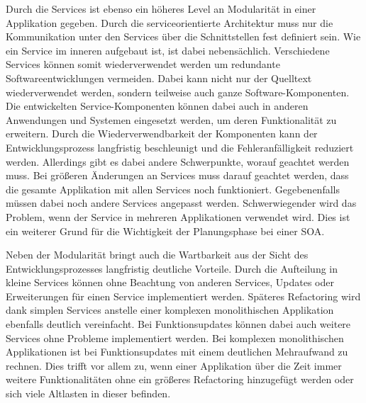 Durch die Services ist ebenso ein höheres Level an Modularität in einer Applikation gegeben. Durch die serviceorientierte Architektur muss nur die Kommunikation unter den Services über die Schnittstellen fest definiert sein. Wie ein Service im inneren aufgebaut ist, ist dabei nebensächlich. Verschiedene Services können somit wiederverwendet werden um redundante Softwareentwicklungen vermeiden. Dabei kann nicht nur der Quelltext wiederverwendet werden, sondern teilweise auch ganze Software-Komponenten. Die entwickelten Service-Komponenten können dabei auch in anderen Anwendungen und Systemen eingesetzt werden, um deren Funktionalität zu erweitern. Durch die Wiederverwendbarkeit der Komponenten kann der Entwicklungsprozess langfristig beschleunigt und die Fehleranfälligkeit reduziert werden. Allerdings gibt es dabei andere Schwerpunkte, worauf geachtet werden muss. Bei größeren Änderungen an Services muss darauf geachtet werden, dass die gesamte Applikation mit allen Services noch funktioniert. Gegebenenfalls müssen dabei noch andere Services angepasst werden. Schwerwiegender wird das Problem, wenn der Service in mehreren Applikationen verwendet wird. Dies ist ein weiterer Grund für die Wichtigkeit der Planungsphase bei einer SOA. 

Neben der Modularität bringt auch die Wartbarkeit aus der Sicht des Entwicklungsprozesses langfristig deutliche Vorteile. Durch die Aufteilung in kleine Services können ohne Beachtung von anderen Services, Updates oder Erweiterungen für einen Service implementiert werden. Späteres Refactoring wird dank simplen Services anstelle einer komplexen monolithischen Applikation ebenfalls deutlich vereinfacht. Bei Funktionsupdates können dabei auch weitere Services ohne Probleme implementiert werden. Bei komplexen monolithischen Applikationen ist bei Funktionsupdates mit einem deutlichen Mehraufwand zu rechnen. Dies trifft vor allem zu, wenn einer Applikation über die Zeit immer weitere Funktionalitäten ohne ein größeres Refactoring hinzugefügt werden oder sich viele Altlasten in dieser befinden. \cite{NADAREISHVILI.2016}
